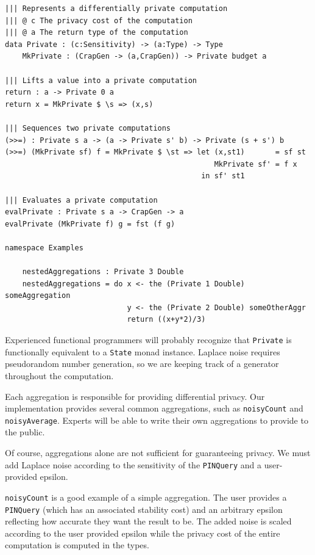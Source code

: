 \documentclass[12pt]{article}
\begin{document}
\begin{lstlisting}[caption={Representing differentially private mechanisms},label={lst:mechanisms}]
||| Represents a differentially private computation
||| @ c The privacy cost of the computation
||| @ a The return type of the computation
data Private : (c:Sensitivity) -> (a:Type) -> Type
    MkPrivate : (CrapGen -> (a,CrapGen)) -> Private budget a

||| Lifts a value into a private computation
return : a -> Private 0 a
return x = MkPrivate $ \s => (x,s)

||| Sequences two private computations
(>>=) : Private s a -> (a -> Private s' b) -> Private (s + s') b
(>>=) (MkPrivate sf) f = MkPrivate $ \st => let (x,st1)       = sf st
                                                MkPrivate sf' = f x
                                             in sf' st1

||| Evaluates a private computation
evalPrivate : Private s a -> CrapGen -> a
evalPrivate (MkPrivate f) g = fst (f g)

namespace Examples

    nestedAggregations : Private 3 Double
    nestedAggregations = do x <- the (Private 1 Double) someAggregation
                            y <- the (Private 2 Double) someOtherAggr
                            return ((x+y*2)/3)
\end{lstlisting}

Experienced functional programmers will probably recognize that \texttt{Private} is functionally equivalent to a \texttt{State} monad instance.
Laplace noise requires pseudorandom number generation, so we are keeping track of a generator throughout the computation.

Each aggregation is responsible for providing differential privacy.
Our implementation provides several common aggregations, such as \texttt{noisyCount} and \texttt{noisyAverage}.
Experts will be able to write their own aggregations to provide to the public.

Of course, aggregations alone are not sufficient for guaranteeing privacy.
We must add Laplace noise according to the sensitivity of the \texttt{PINQuery} and a user-provided epsilon.

\texttt{noisyCount} is a good example of a simple aggregation.
The user provides a \texttt{PINQuery} (which has an associated stability cost) and an arbitrary epsilon reflecting how accurate they want the result to be.
The added noise is scaled according to the user provided epsilon while the privacy cost of the entire computation is computed in the types.
\end{document}
